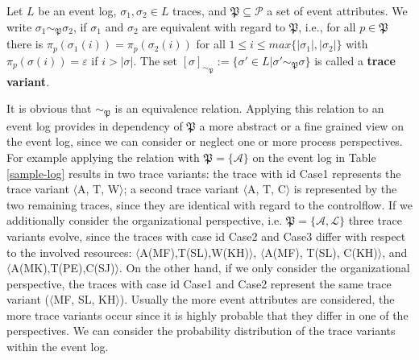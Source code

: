 \documentclass[runningheads]{llncs}
\begin{document}
\begin{definition}
	Let $L$ be an event log, $\sigma_1, \sigma_2 \in L$ traces, and $\mathfrak{P} \subseteq \mathcal{P}$ a set of event attributes. We write $\sigma_1 \sim_{\mathfrak{P}} \sigma_2$, if $\sigma_1$ and $\sigma_2$ are equivalent with regard to $\mathfrak{P}$, i.e., for all $p \in \mathfrak{P}$ there is $\pi_{p}(\sigma_1(i)) = \pi_{p}(\sigma_2(i))$ for all $1 \leq i \leq max\{\vert\sigma_1 \vert, \vert\sigma_2 \vert\}$ with $\pi_{p}(\sigma(i)) = \varepsilon$ if $i > \vert \sigma \vert$. The set $\left[\sigma\right]_{\sim_{\mathfrak{P}}} := \{\sigma' \in L \vert \sigma' \sim_{\mathfrak{P}} \sigma \}$ is called a \textbf{trace variant}.  
\end{definition}
It is obvious that $\sim_{\mathfrak{P}}$ is an equivalence relation. Applying this relation to an event log provides in dependency of $\mathfrak{P}$ a more abstract or a fine grained view on the event log, since we can consider or neglect one or more process perspectives. For example applying the relation with $\mathfrak{P} = \{\mathcal{A}\}$ on the event log in Table \ref{sample-log} results in two trace variants: the trace with id Case1 represents the trace variant $\langle$A, T, W$\rangle$; a second trace variant $\langle$A, T, C$\rangle$ is represented by the two remaining traces, since they are identical with regard to the controlflow. If we additionally consider the organizational perspective, i.e. $\mathfrak{P} = \{\mathcal{A}, \mathcal{L}\}$ three trace variants evolve, since the traces with case id Case2 and Case3 differ with respect to the involved resources: $\langle$A(MF),T(SL),W(KH)$\rangle$, $\langle$A(MF), T(SL), C(KH)$\rangle$, and $\langle$A(MK),T(PE),C(SJ)$\rangle$. On the other hand, if we only consider the organizational perspective, the traces with case id Case1 and Case2 represent the same trace variant ($\langle$MF, SL, KH$\rangle$).
Usually the more event attributes are considered, the more trace variants occur since it is highly probable that they differ in one of the perspectives. We can consider the probability distribution of the trace variants within the event log.
\end{document}
